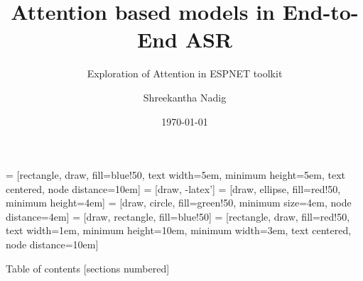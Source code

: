 \documentclass{beamer}
\title{Attention based models in End-to-End ASR}
\subtitle{Exploration of Attention in ESPNET toolkit}
\date{\today}
\author{Shreekantha Nadig}
\institute{International Institute of Information Technology - Bangalore}
\begin{document}
 = [rectangle, draw, fill=blue!50, text width=5em, minimum height=5em, text centered, node distance=10em]
 = [draw, -latex']
 = [draw, ellipse, fill=red!50, minimum height=4em]
 = [draw, circle, fill=green!50, minimum size=4em, node distance=4em]
 = [draw, rectangle, fill=blue!50]
 = [rectangle, draw, fill=red!50, text width=1em, minimum height=10em, minimum width=3em, text centered, node distance=10em]
\maketitle
\begin{frame}{Table of contents}
[sections numbered]
\tableofcontents[hideallsubsections]
\end{frame}
\end{document}
